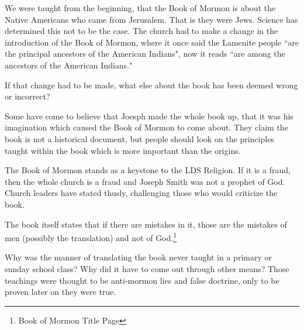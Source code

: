 We were taught from the beginning, that the Book of Mormon is about the Native
Americans who came from Jerusalem. That is they were Jews. Science has determined
this not to be the case. The church had to make a change in the introduction of the
Book of Mormon, where it once said the Lamenite people ``are the principal ancestors 
of the American Indians", now it reads ``are among the ancestors of the American 
Indians."

If that change had to be made, what else about the book has been deemed wrong or
incorrect?

Some have come to believe that Joesph made the whole book up, that it was his
imagination which caused the Book of Mormon to come about. They claim the book is not
a historical document, but people should look on the principles taught within the
book which is more important than the origins.

The Book of Mormon stands as a keystone to the LDS Religion. If it is a fraud, then
the whole church is a fraud and Joseph Smith was not a prophet of God. Church leaders
have stated thusly, challenging those who would criticize the book.

The book itself states that if there are mistakes in it, those are the mistakes of
men (possibly the translation) and not of God.\footnote{Book of Mormon Title Page}

Why was the manner of translating the book never taught in a primary or sunday school
class? Why did it have to come out through other means? Those teachings were thought
to be anti-mormon lies and false doctrine, only to be proven later on they were true.